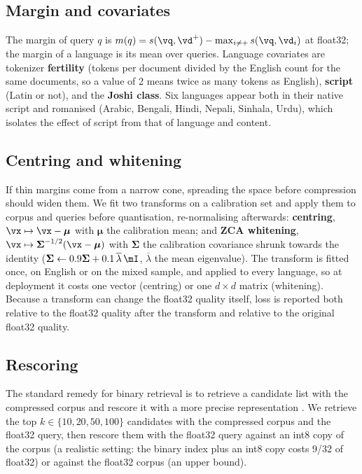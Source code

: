 \documentclass[10pt]{article}
\begin{document}
\subsection{Margin and covariates}
The margin of query $q$ is $m(q)=s(\vq,\vd^+)-\max_{i\ne +}s(\vq,\vd_i)$ at float32; the margin of a language is its mean over queries. Language covariates are tokenizer \textbf{fertility} (tokens per document divided by the English count for the same documents, so a value of 2 means twice as many tokens as English), \textbf{script} (Latin or not), and the \textbf{Joshi class}. Six languages appear both in their native script and romanised (Arabic, Bengali, Hindi, Nepali, Sinhala, Urdu), which isolates the effect of script from that of language and content.

\subsection{Centring and whitening}\label{sec:whitenmethod}
If thin margins come from a narrow cone, spreading the space before compression should widen them. We fit two transforms on a calibration set and apply them to corpus and queries before quantisation, re-normalising afterwards: \textbf{centring}, $\vx\mapsto\vx-\boldsymbol{\mu}$ with $\boldsymbol{\mu}$ the calibration mean; and \textbf{ZCA whitening}, $\vx\mapsto\boldsymbol{\Sigma}^{-1/2}(\vx-\boldsymbol{\mu})$ with $\boldsymbol{\Sigma}$ the calibration covariance shrunk towards the identity ($\boldsymbol{\Sigma}\leftarrow0.9\boldsymbol{\Sigma}+0.1\,\overline{\lambda}\,\mI$, $\overline{\lambda}$ the mean eigenvalue). The transform is fitted once, on English or on the mixed sample, and applied to every language, so at deployment it costs one vector (centring) or one $d\times d$ matrix (whitening). Because a transform can change the float32 quality itself, loss is reported both relative to the float32 quality after the transform and relative to the original float32 quality.

\subsection{Rescoring}\label{sec:rescoremethod}
The standard remedy for binary retrieval is to retrieve a candidate list with the compressed corpus and rescore it with a more precise representation \citep{shakir2024quant}. We retrieve the top $k\in\{10,20,50,100\}$ candidates with the compressed corpus and the float32 query, then rescore them with the float32 query against an int8 copy of the corpus (a realistic setting: the binary index plus an int8 copy costs 9/32 of float32) or against the float32 corpus (an upper bound).
\end{document}
